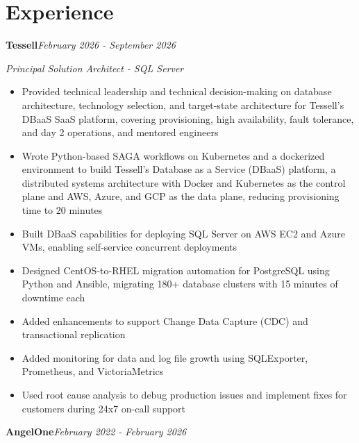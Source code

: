\documentclass[10pt,a4paper]{article}
\begin{document}
\section{Experience}

\noindent\textbf{Tessell}\hfill \textit{February 2026 - September 2026}

\textit{Principal Solution Architect - SQL Server}\\[-5pt]
\begin{itemize}
  \item Provided technical leadership and technical decision-making on database architecture, technology selection, and target-state architecture for Tessell's DBaaS SaaS platform, covering provisioning, high availability, fault tolerance, and day 2 operations, and mentored engineers
  \item Wrote Python-based SAGA workflows on Kubernetes and a dockerized environment to build Tessell's Database as a Service (DBaaS) platform, a distributed systems architecture with Docker and Kubernetes as the control plane and AWS, Azure, and GCP as the data plane, reducing provisioning time to 20 minutes
  \item Built DBaaS capabilities for deploying SQL Server on AWS EC2 and Azure VMs, enabling self-service concurrent deployments
  \item Designed CentOS-to-RHEL migration automation for PostgreSQL using Python and Ansible, migrating 180+ database clusters with 15 minutes of downtime each
  \item Added enhancements to support Change Data Capture (CDC) and transactional replication
  \item Added monitoring for data and log file growth using SQLExporter, Prometheus, and VictoriaMetrics
  \item Used root cause analysis to debug production issues and implement fixes for customers during 24x7 on-call support
\end{itemize}
\vspace{14.7pt}
\noindent\textbf{AngelOne}\hfill \textit{February 2022 - February 2026}
\end{document}

